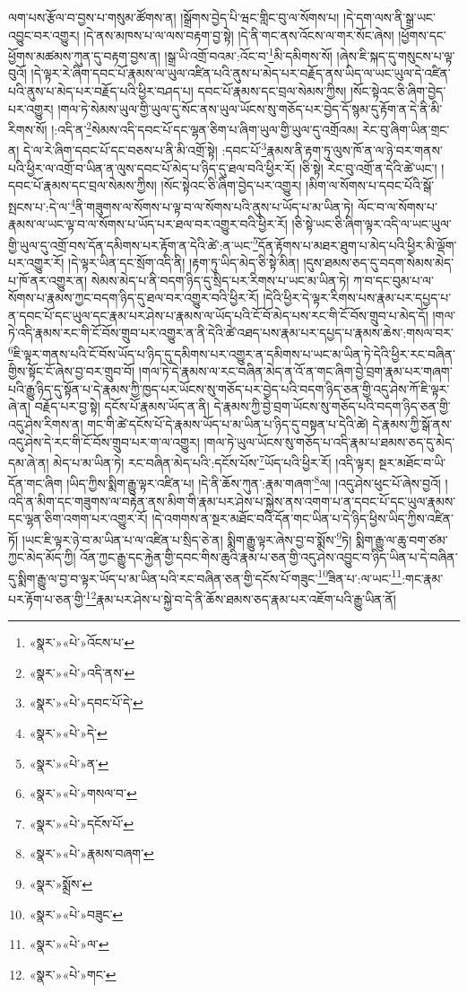 ལག་པས་རྩོལ་བ་བྱས་པ་གསུམ་ཚོགས་ན། །སྒྲོགས་བྱེད་པི་ཝང་གླིང་བུ་ལ་སོགས་པ། །དེ་དག་ལས་ནི་སྒྲ་ཡང་འབྱུང་བར་འགྱུར། །དེ་ནས་མཁས་པ་ལ་ལས་བརྟག་བྱ་སྟེ། །དེ་ནི་གང་ནས་འོངས་ལ་གར་སོང་ཞེས། །ཕྱོགས་དང་ཕྱོགས་མཚམས་ཀུན་དུ་བརྟག་བྱས་ན། །སྒྲ་ཡི་འགྲོ་བའམ་:འོང་བ་\footnote{«སྣར་»«པེ་»འོངས་པ་}མི་དམིགས་སོ། །ཞེས་ཇི་སྐད་དུ་གསུངས་པ་ལྟ་བུའོ། །དེ་ལྟར་རེ་ཞིག་དབང་པོ་རྣམས་ལ་ཡུལ་འཛིན་པའི་ནུས་པ་མེད་པར་བརྗོད་ནས་ཡིད་ལ་ཡང་ཡུལ་དེ་འཛིན་པའི་ནུས་པ་མེད་པར་བརྗོད་པའི་ཕྱིར་བཤད་པ། དབང་པོ་རྣམས་དང་བྲལ་སེམས་ཀྱིས། །སོང་སྟེའང་ཅི་ཞིག་བྱེད་པར་འགྱུར། །གལ་ཏེ་སེམས་ཡུལ་གྱི་ཡུལ་དུ་སོང་ནས་ཡུལ་ཡོངས་སུ་གཅོད་པར་བྱེད་དོ་སྙམ་དུ་རྟོག་ན་དེ་ནི་མི་རིགས་སོ། །:འདི་ན་\footnote{«སྣར་»«པེ་»འདི་ནས་}སེམས་འདི་དབང་པོ་དང་ལྷན་ཅིག་པ་ཞིག་ཡུལ་གྱི་ཡུལ་དུ་འགྲོའམ། རེང་བུ་ཞིག་ཡིན་གྲང་ན། དེ་ལ་རེ་ཞིག་དབང་པོ་དང་བཅས་པ་ནི་མི་འགྲོ་སྟེ། :དབང་པོ་\footnote{«སྣར་»«པེ་»དབང་པོ་དེ་}རྣམས་ནི་རྟག་ཏུ་ལུས་ཁོ་ན་ལ་ཉེ་བར་གནས་པའི་ཕྱིར་ལ་འགྲོ་བ་ཡིན་ན་ལུས་དབང་པོ་མེད་པ་ཉིད་དུ་ཐལ་བའི་ཕྱིར་རོ། །ཅི་སྟེ། རེང་བུ་འགྲོ་ན་དེའི་ཚེ་ཡང་། །དབང་པོ་རྣམས་དང་བྲལ་སེམས་ཀྱིས། །སོང་སྟེའང་ཅི་ཞིག་བྱེད་པར་འགྱུར། །མིག་ལ་སོགས་པ་དབང་པོའི་སྒོ་སྤངས་པ་:དེ་ལ་\footnote{«སྣར་»«པེ་»དེ་}ནི་གཟུགས་ལ་སོགས་པ་ལྟ་བ་ལ་སོགས་པའི་ནུས་པ་ཡོད་པ་མ་ཡིན་ཏེ། ལོང་བ་ལ་སོགས་པ་རྣམས་ལ་ཡང་ལྟ་བ་ལ་སོགས་པ་ཡོད་པར་ཐལ་བར་འགྱུར་བའི་ཕྱིར་རོ། །ཅི་སྟེ་ཡང་ཅི་ཞིག་ལྟར་འདི་ལ་ཡང་ཡུལ་གྱི་ཡུལ་དུ་འགྲོ་བས་དོན་དམིགས་པར་རྟོག་ན་དེའི་ཚེ་:ན་ཡང་\footnote{«སྣར་»«པེ་»ན་}དོན་རྟོགས་པ་མཐར་ཐུག་པ་མེད་པའི་ཕྱིར་མི་ལྡོག་པར་འགྱུར་རོ། །དེ་ལྟར་ཡིན་དང་སྲོག་འདི་ནི། །རྟག་ཏུ་ཡིད་མེད་ཅི་སྟེ་མིན། །དུས་ཐམས་ཅད་དུ་བདག་སེམས་མེད་པ་ཁོ་ནར་འགྱུར་ན། སེམས་མེད་པ་ནི་བདག་ཉིད་དུ་སྲིད་པར་རིགས་པ་ཡང་མ་ཡིན་ཏེ། ཀ་བ་དང་བུམ་པ་ལ་སོགས་པ་རྣམས་ཀྱང་བདག་ཉིད་དུ་ཐལ་བར་འགྱུར་བའི་ཕྱིར་རོ། །དེའི་ཕྱིར་དེ་ལྟར་རིགས་པས་རྣམ་པར་དཔྱད་པ་ན་དབང་པོ་དང་ཡུལ་དང་རྣམ་པར་ཤེས་པ་རྣམས་ལ་ཡོད་པའི་ངོ་བོ་མེད་པས་རང་གི་ངོ་བོས་གྲུབ་པ་མེད་དོ། །གལ་ཏེ་འདི་རྣམས་རང་གི་ངོ་བོས་གྲུབ་པར་འགྱུར་ན་ནི་དེའི་ཚེ་འཐད་པས་རྣམ་པར་དཔྱད་པ་རྣམས་ཆེས་:གསལ་བར་\footnote{«སྣར་»«པེ་»གསལ་བ་}ཇི་ལྟར་གནས་པའི་ངོ་བོས་ཡོད་པ་ཉིད་དུ་དམིགས་པར་འགྱུར་ན་དམིགས་པ་ཡང་མ་ཡིན་ཏེ་དེའི་ཕྱིར་རང་བཞིན་གྱིས་སྟོང་ངོ་ཞེས་བྱ་བར་གྲུབ་བོ། །གལ་ཏེ་དེ་རྣམས་ལ་རང་བཞིན་མེད་ན་འོ་ན་གང་ཞིག་བྱེ་བྲག་རྣམ་པར་གཞག་པའི་རྒྱུ་ཉིད་དུ་སྟོན་པ་དེ་རྣམས་ཀྱི་ཁྱད་པར་ཡོངས་སུ་གཅོད་པར་བྱེད་པའི་བདག་ཉིད་ཅན་གྱི་འདུ་ཤེས་ཀོ་ཇི་ལྟར་ཞེ་ན། བརྗོད་པར་བྱ་སྟེ། དངོས་པོ་རྣམས་ཡོད་ན་ནི། དེ་རྣམས་ཀྱི་བྱེ་བྲག་ཡོངས་སུ་གཅོད་པའི་བདག་ཉིད་ཅན་གྱི་འདུ་ཤེས་རིགས་ན། གང་གི་ཚེ་དངོས་པོ་དེ་རྣམས་ཡོད་པ་མ་ཡིན་པ་ཉིད་དུ་བསྟན་པ་དེའི་ཚེ། དེ་རྣམས་ཀྱི་སྒོ་ནས་འདུ་ཤེས་དེ་རང་གི་ངོ་བོས་གྲུབ་པར་ག་ལ་འགྱུར། །གལ་ཏེ་ཡུལ་ཡོངས་སུ་གཅོད་པ་འདི་རྣམ་པ་ཐམས་ཅད་དུ་མེད་དམ་ཞེ་ན། མེད་པ་མ་ཡིན་ཏེ། རང་བཞིན་མེད་པའི་:དངོས་པོས་\footnote{«སྣར་»«པེ་»དངོས་པོ་}ཡོད་པའི་ཕྱིར་རོ། །འདི་ལྟར། སྔར་མཐོང་བ་ཡི་དོན་གང་ཞིག །ཡིད་ཀྱིས་སྨིག་རྒྱུ་ལྟར་འཛིན་པ། །དེ་ནི་ཆོས་ཀུན་:རྣམ་གཞག་\footnote{«སྣར་»«པེ་»རྣམས་བཞག་}ལ། །འདུ་ཤེས་ཕུང་པོ་ཞེས་བྱའོ། །འདི་ན་མིག་དང་གཟུགས་ལ་བརྟེན་ནས་མིག་གི་རྣམ་པར་ཤེས་པ་སྐྱེས་ནས་འགག་པ་ན་དབང་པོ་དང་ཡུལ་རྣམས་དང་ལྷན་ཅིག་འགག་པར་འགྱུར་རོ། །དེ་འགགས་ན་སྔར་མཐོང་བའི་དོན་གང་ཡིན་པ་དེ་ཉིད་ཕྱིས་ཡིད་ཀྱིས་འཛིན་ཏོ། །ཡང་ཇི་ལྟར་ཉེ་བ་མ་ཡིན་པ་ལ་འཛིན་པ་སྲིད་ཅེ་ན། སྨིག་རྒྱུ་ལྟར་ཞེས་བྱ་བ་སྨོས་\footnote{«སྣར་»སྨྲོས་}ཏེ། སྨིག་རྒྱུ་ལ་ཆུ་བག་ཙམ་ཀྱང་མེད་མོད་ཀྱི། འོན་ཀྱང་རྒྱུ་དང་རྐྱེན་གྱི་དབང་གིས་ཆུའི་རྣམ་པ་ཅན་གྱི་འདུ་ཤེས་འབྱུང་བ་ཉིད་ཡིན་པ་དེ་བཞིན་དུ་སྨིག་རྒྱུ་ལ་བྱ་བ་ལྟར་ཡོད་པ་མ་ཡིན་པའི་རང་བཞིན་ཅན་གྱི་དངོས་པོ་གཟུང་\footnote{«སྣར་»«པེ་»བཟུང་}ཟིན་པ་:ལ་ཡང་\footnote{«སྣར་»«པེ་»ལ་}:གང་རྣམ་པར་རྟོག་པ་ཅན་གྱི་\footnote{«སྣར་»«པེ་»གང་}རྣམ་པར་ཤེས་པ་སྐྱེ་བ་དེ་ནི་ཆོས་ཐམས་ཅད་རྣམ་པར་འཇོག་པའི་རྒྱུ་ཡིན་ནོ། 